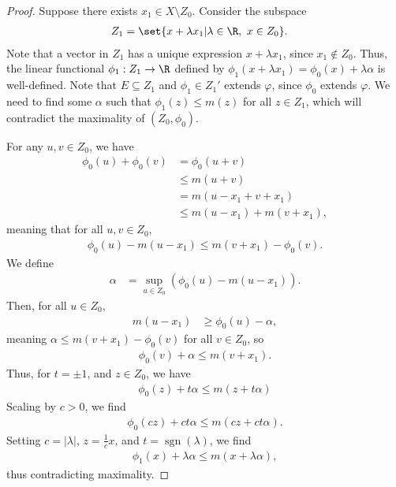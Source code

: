\documentclass[10pt]{mypackage}
\begin{document}
\begin{proof}
    Suppose there exists $x_1\in X\setminus Z_0$. Consider the subspace
    \begin{align*}
      Z_1 &= \set{x + \lambda x_1| \lambda\in \R,~x\in Z_0}.
    \end{align*}
    Note that a vector in $Z_1$ has a unique expression $x + \lambda x_1$, since $x_1\notin Z_0$. Thus, the linear functional $\phi_1: Z_1\rightarrow \R$ defined by $\phi_1\left(x + \lambda x_1\right) = \phi_0\left(x\right) + \lambda \alpha$ is well-defined. Note that $E\subseteq Z_1$ and $\phi_1\in Z_1'$ extends $\varphi$, since $\phi_0$ extends $\varphi$. We need to find some $\alpha$ such that $\phi_1\left(z\right) \leq m(z)$ for all $z\in Z_1$, which will contradict the maximality of $\left(Z_0,\phi_0\right)$.\newline

    For any $u,v\in Z_0$, we have
    \begin{align*}
      \phi_0\left(u\right) + \phi_0\left(v\right) &= \phi_0(u+v)\\
                                                  &\leq m\left(u+v\right)\\
                                                  &= m\left(u-x_1 + v+x_1\right)\\
                                                  &\leq m\left(u-x_1\right) + m\left(v + x_1\right),
    \end{align*}
    meaning that for all $u,v\in Z_0$,
    \begin{align*}
      \phi_0\left(u\right) - m\left(u-x_1\right) \leq m\left(v + x_1\right) - \phi_0(v).
    \end{align*}
    We define
    \begin{align*}
      \alpha &= \sup_{u\in Z_0}\left(\phi_0\left(u\right) - m\left(u-x_1\right)\right).
    \end{align*}
    Then, for all $u\in Z_0$,
    \begin{align*}
      m\left(u-x_1\right) &\geq \phi_0\left(u\right) - \alpha,
    \end{align*}
    meaning $\alpha \leq m\left(v+x_1 \right) - \phi_0(v)$ for all $v\in Z_0$, so
    \begin{align*}
      \phi_0(v) + \alpha \leq m\left(v + x_1\right).
    \end{align*}
    Thus, for $t = \pm 1$, and $z\in Z_0$, we have
    \begin{align*}
      \phi_0(z) + t\alpha \leq m\left(z + t\alpha\right)
    \end{align*}
    Scaling by $c > 0$, we find
    \begin{align*}
      \phi_0\left(cz\right) + ct\alpha \leq m\left(cz + ct\alpha\right).
    \end{align*}
    Setting $c = |\lambda|$, $z = \frac{1}{c}x$, and $t = \operatorname{sgn}\left(\lambda\right)$, we find 
    \begin{align*}
      \phi_1\left(x\right) + \lambda\alpha \leq m\left(x + \lambda\alpha\right),
    \end{align*}
    thus contradicting maximality.
  \end{proof}
\end{document}
